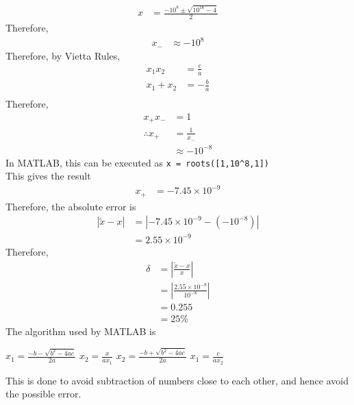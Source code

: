 \documentclass[fleqn, a4paper, 12pt, twoside, titlepage]{article}
\theoremstyle{definition}
\theoremstyle{theorem}
\renewcommand{\tilde}{\widetilde}
\begin{document}
\begin{solution}
	\begin{align*}
		x & = \frac{-10^8 \pm \sqrt{10^{16} - 4}}{2}
	\end{align*}
	Therefore,
	\begin{align*}
		x_{-} & \approx -10^8
	\end{align*}
	Therefore, by Vietta Rules,
	\begin{align*}
		x_1 x_2   & = \frac{c}{a}  \\
		x_1 + x_2 & = -\frac{b}{a} \\
	\end{align*}
	Therefore,
	\begin{align*}
		x_{+} x_{-}      & = 1               \\
		\therefore x_{+} & = \frac{1}{x_{-}} \\
                                 & \approx -10^{-8}
	\end{align*}
	In MATLAB, this can be executed as \lstinline!x = roots([1,10^8,1])!\\
	This gives the result
	\begin{align*}
		x_{+} & = -7.45 \times 10^{-9}
	\end{align*}
	Therefore, the absolute error is
	\begin{align*}
		\left| \tilde{x} - x \right| & = \left| -7.45 \times 10^{-9} - \left( -10^{-8} \right) \right| \\
                                             & = 2.55 \times 10^{-9}
	\end{align*}
	Therefore,
	\begin{align*}
		\delta & = \left| \frac{\tilde{x} - x}{x} \right|             \\
                       & = \left| \frac{2.55 \times 10^{-9}}{10^{-8}} \right| \\
                       & = 0.255                                              \\
                       & = 25 \%
	\end{align*}
	The algorithm used by MATLAB is
	\begin{algorithmic}
			\State $x_1 = \frac{-b - \sqrt{b^2 - 4 a c}}{2 a}$
			\State $x_2 = \frac{x}{a x_1}$
		\Else
			\State $x_2 = \frac{-b + \sqrt{b^2 - 4 a c}}{2 a}$
			\State $x_1 = \frac{c}{a x_2}$
		\EndIf
	\end{algorithmic}
	This is done to avoid subtraction of numbers close to each other, and hence avoid the possible error.
\end{solution}
\end{document}
